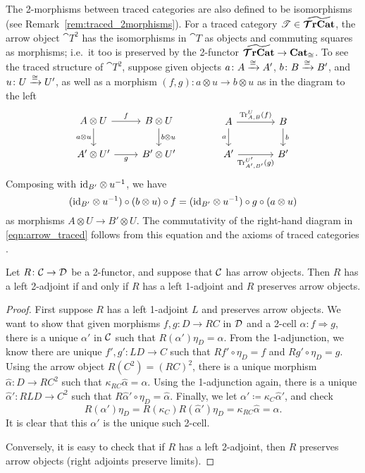 \documentclass[11pt,oneside,article]{memoir}
\begin{document}
\begin{example}
The 2-morphisms between traced categories are also defined to be isomorphisms (see
Remark~\ref{rem:traced_2morphisms}). For a traced category $\mathscr{T}\in\widetilde{\bm{\mathcal{T}}\mathbf{rCat}}$, the arrow
object $\cat{T}^2$ has the isomorphisms in $\cat{T}$ as objects and commuting squares as morphisms;
i.e.\ it too is preserved by the 2-functor $\widetilde{\bm{\mathcal{T}}\mathbf{rCat}}\to\mathbf{Cat}_{\cong}$. To see the traced
structure of $\cat{T}^2$, suppose given objects $a\colon A\xrightarrow{\cong} A'$, $b\colon B\xrightarrow{\cong} B'$,
and $u\colon U\xrightarrow{\cong} U'$, as well as a morphism $(f,g)\colon a\otimes u\to b\otimes u$ as in the
diagram to the left
\begin{equation}
      \label{eqn:arrow_traced}
   \begin{tikzcd}
      A\otimes U\ar[d,"a\otimes u"']\ar[r,"f"]&B\otimes U\ar[d,"b\otimes u"]\\
      A'\otimes U'\ar[r,"g"']&B'\otimes U'
   \end{tikzcd}
   \qquad\qquad
   \begin{tikzcd}[column sep=large]
      A\ar[d,"a"']\ar[r,"\Tr^U_{A,B}(f)"]&B\ar[d,"b"]\\
      A'\ar[r,"\Tr^{U'}_{A',B'}(g)"']&B'
   \end{tikzcd}
\end{equation}
Composing with $\mathrm{id}_{B'}\otimes u^{-1}$, we have
\[
   (\mathrm{id}_{B'}\otimes u^{-1})\circ(b\otimes u)\circ f
      =(\mathrm{id}_{B'}\otimes u^{-1})\circ g\circ(a\otimes u)
\]
as morphisms $A\otimes U\to B'\otimes U$. The commutativity of the right-hand diagram in
\eqref{eqn:arrow_traced} follows from this equation and the axioms of traced categories
\cite{JoyalStreetVerity}.
\end{example}

\begin{lemma}
      \label{lem:2_adjunction}
   Let $R\colon\mathcal{C}\to\mathcal{D}$ be a 2-functor, and suppose that $\mathcal{C}$ has arrow objects.
   Then $R$ has a left 2-adjoint if and only if $R$ has a left 1-adjoint and $R$ preserves arrow
   objects.
\end{lemma}
\begin{proof}
   First suppose $R$ has a left 1-adjoint $L$ and preserves arrow objects. We want to show that
   given morphisms $f,g\colon D\to RC$ in $\mathcal{D}$ and a 2-cell $\alpha\colon f\Rightarrow g$,
   there is a unique $\alpha'$ in $\mathcal{C}$ such that $R(\alpha')\eta_D=\alpha$. From the
   1-adjunction, we know there are unique $f',g'\colon LD\to C$ such that $Rf'\circ\eta_D=f$ and
   $Rg'\circ\eta_D=g$. Using the arrow object $R(C^2)=(RC)^2$, there is a unique morphism
   $\hat{\alpha}\colon D\to RC^2$ such that $\kappa_{RC}\hat{\alpha}=\alpha$. Using the 1-adjunction
   again, there is a unique $\hat{\alpha}'\colon RLD\to C^2$ such that
   $R\hat{\alpha}'\circ\eta_D=\hat{\alpha}$. Finally, we let
   $\alpha'\coloneqq\kappa_C\hat{\alpha}'$, and check
   \[
      R(\alpha')\eta_D = R(\kappa_C)R(\hat{\alpha}')\eta_D = \kappa_{RC}\hat{\alpha} = \alpha.
   \]
   It is clear that this $\alpha'$ is the unique such 2-cell.

   Conversely, it is easy to check that if $R$ has a left 2-adjoint, then $R$ preserves arrow
   objects (right adjoints preserve limits).
\end{proof}
\end{document}

